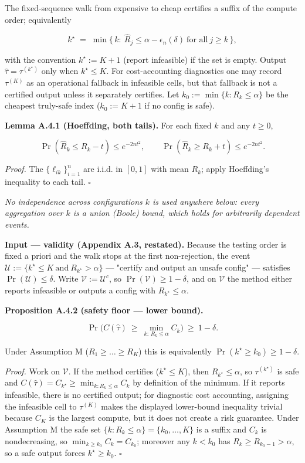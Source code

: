\documentclass{ieeeaccess}
\begin{document}
The fixed-sequence walk from expensive to cheap certifies a suffix of the compute order; equivalently

\[
k^\star\;=\;\min\Big\{\,k:\ \hat R_j\le\alpha-\epsilon_n(\delta)\ \text{for all}\ j\ge k\,\Big\},
\]

with the convention $k^\star:=K+1$ (report infeasible) if the set is empty. Output $\hat\tau=\tau^{(k^\star)}$ only when $k^\star\le K$. For cost-accounting diagnostics one may record $\tau^{(K)}$ as an operational fallback in infeasible cells, but that fallback is not a certified output unless it separately certifies. Let $k_0:=\min\{k:R_k\le\alpha\}$ be the cheapest truly-safe index ($k_0:=K+1$ if no config is safe).

\textbf{Lemma A.4.1 (Hoeffding, both tails).} For each fixed $k$ and any $t\ge0$,

\[
\Pr(\hat R_k\le R_k-t)\le e^{-2nt^2},\qquad \Pr(\hat R_k\ge R_k+t)\le e^{-2nt^2}.
\]

\emph{Proof.} The $\{\ell_{ik}\}_{i=1}^n$ are i.i.d. in $[0,1]$ with mean $R_k$; apply Hoeffding's inequality to each tail. $\square$

\emph{No independence across configurations $k$ is used anywhere below: every aggregation over $k$ is a union (Boole) bound, which holds for arbitrarily dependent events.}

\textbf{Input --- validity (Appendix A.3, restated).} Because the testing order is fixed a priori and the walk stops at the first non-rejection, the event $\mathcal U:=\{k^\star\le K\ \text{and}\ R_{k^\star}>\alpha\}$ --- "certify and output an unsafe config" --- satisfies $\Pr(\mathcal U)\le\delta$. Write $\mathcal V:=\mathcal U^{c}$, so $\Pr(\mathcal V)\ge1-\delta$, and on $\mathcal V$ the method either reports infeasible or outputs a config with $R_{k^\star}\le\alpha$.

\textbf{Proposition A.4.2 (safety floor --- lower bound).}

\[
\Pr\Big(C(\hat\tau)\ \ge\ \min_{k:\,R_k\le\alpha}C_k\Big)\ \ge\ 1-\delta .
\]

Under Assumption M ($R_1\ge\dots\ge R_K$) this is equivalently $\Pr(k^\star\ge k_0)\ge1-\delta$.

\emph{Proof.} Work on $\mathcal V$. If the method certifies ($k^\star\le K$), then $R_{k^\star}\le\alpha$, so $\tau^{(k^\star)}$ is safe and $C(\hat\tau)=C_{k^\star}\ge\min_{k:R_k\le\alpha}C_k$ by definition of the minimum. If it reports infeasible, there is no certified output; for diagnostic cost accounting, assigning the infeasible cell to $\tau^{(K)}$ makes the displayed lower-bound inequality trivial because $C_K$ is the largest compute, but it does not create a risk guarantee. Under Assumption M the safe set $\{k:R_k\le\alpha\}=\{k_0,\dots,K\}$ is a suffix and $C_k$ is nondecreasing, so $\min_{k\ge k_0}C_k=C_{k_0}$; moreover any $k<k_0$ has $R_k\ge R_{k_0-1}>\alpha$, so a safe output forces $k^\star\ge k_0$. $\square$
\end{document}
